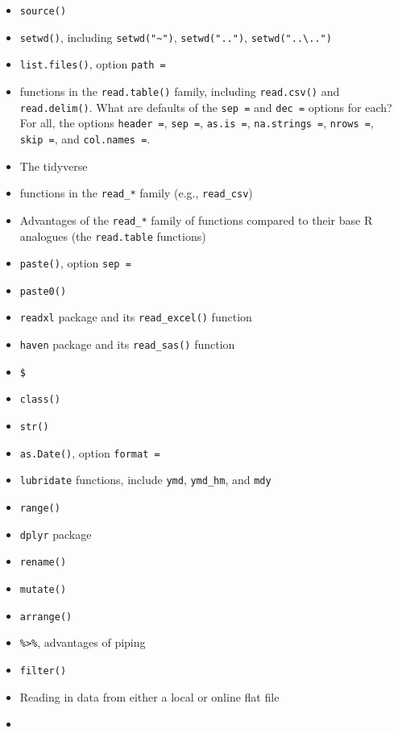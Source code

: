 \documentclass[]{book}
\providecommand{\tightlist}{%
  \setlength{\itemsep}{0pt}\setlength{\parskip}{0pt}}
\theoremstyle{definition}
\theoremstyle{definition}
\theoremstyle{definition}
\theoremstyle{remark}
\begin{document}
\begin{itemize}
\tightlist
\item
  \texttt{source()}
\item
  \texttt{setwd()}, including \texttt{setwd("\textasciitilde{}")},
  \texttt{setwd("..")}, \texttt{setwd("..\textbackslash{}..")}
\item
  \texttt{list.files()}, option \texttt{path\ =}
\item
  functions in the \texttt{read.table()} family, including
  \texttt{read.csv()} and \texttt{read.delim()}. What are defaults of
  the \texttt{sep\ =} and \texttt{dec\ =} options for each? For all, the
  options \texttt{header\ =}, \texttt{sep\ =}, \texttt{as.is\ =},
  \texttt{na.strings\ =}, \texttt{nrows\ =}, \texttt{skip\ =}, and
  \texttt{col.names\ =}.
\item
  The tidyverse
\item
  functions in the \texttt{read\_*} family (e.g., \texttt{read\_csv})
\item
  Advantages of the \texttt{read\_*} family of functions compared to
  their base R analogues (the \texttt{read.table} functions)
\item
  \texttt{paste()}, option \texttt{sep\ =}
\item
  \texttt{paste0()}
\item
  \texttt{readxl} package and its \texttt{read\_excel()} function
\item
  \texttt{haven} package and its \texttt{read\_sas()} function
\item
  \texttt{\$}
\item
  \texttt{class()}
\item
  \texttt{str()}
\item
  \texttt{as.Date()}, option \texttt{format\ =}
\item
  \texttt{lubridate} functions, include \texttt{ymd}, \texttt{ymd\_hm},
  and \texttt{mdy}
\item
  \texttt{range()}
\item
  \texttt{dplyr} package
\item
  \texttt{rename()}
\item
  \texttt{mutate()}
\item
  \texttt{arrange()}
\item
  \texttt{\%\textgreater{}\%}, advantages of piping
\item
  \texttt{filter()}
\item
  Reading in data from either a local or online flat file
\item

\end{itemize}
\end{document}
